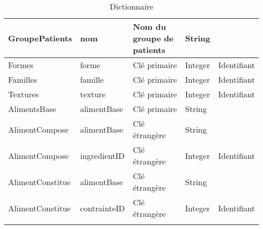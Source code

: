 \begin{longtable}{llp{5cm}ll}
  GroupePatients & nom & Nom du groupe de patients & String & \\ \hline
  Formes & forme & Clé primaire & Integer & Identifiant \\ \hline
  Familles & famille & Clé primaire & Integer & Identifiant \\ \hline
  Textures & texture & Clé primaire & Integer & Identifiant \\ \hline
  AlimentsBase & alimentBase & Clé primaire & String &  \\ \hline
  AlimentCompose & alimentBase & Clé étrangère & String &  \\
  AlimentCompose & ingredientID & Clé étrangère & Integer & Identifiant \\ \hline
  AlimentConstitue & alimentBase & Clé étrangère & String &  \\
  AlimentConstitue & contrainteID & Clé étrangère & Integer & Identifiant \\ \hline
\caption{Dictionnaire}
\label{DictionnaireMDD}
\end{longtable}


